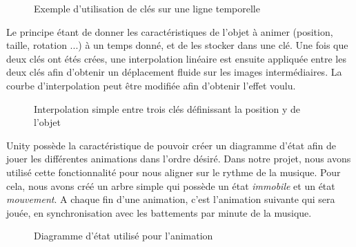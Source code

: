 \begin{figure}[H]\centering
  \caption{Exemple d'utilisation de clés sur une ligne temporelle}
  \label{technique_animation1}
\end{figure}

Le principe étant de donner les caractéristiques de l'objet à animer (position, taille, rotation ...) à un temps donné, et de les stocker dans une clé. Une fois que deux clés ont étés crées, une interpolation linéaire est ensuite appliquée entre les deux clés afin d'obtenir un déplacement fluide sur les images intermédiaires. La courbe d'interpolation peut être modifiée afin d'obtenir l'effet voulu.

\begin{figure}[H]\centering
  \caption{Interpolation simple entre trois clés définissant la position y de l'objet}
  \label{technique_animation2}
\end{figure}

Unity possède la caractéristique de pouvoir créer un diagramme d'état afin de jouer les différentes animations dans l'ordre désiré. Dans notre projet, nous avons utilisé cette fonctionnalité pour nous aligner sur le rythme de la musique. Pour cela, nous avons créé un arbre simple qui possède un état \textit{immobile} et un état \textit{mouvement}. A chaque fin d'une animation, c'est l'animation suivante qui sera jouée, en synchronisation avec les battements par minute de la musique.

\begin{figure}[H]\centering
  \caption{Diagramme d'état utilisé pour l'animation}
  \label{technique_animation3}
\end{figure}


